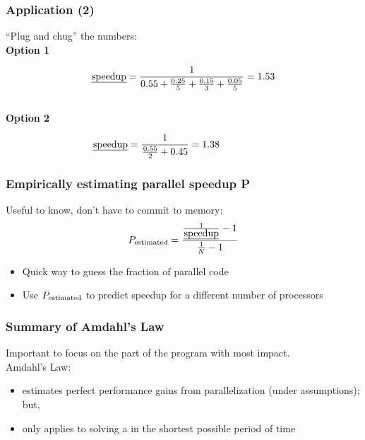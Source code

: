 \begin{frame}
  \frametitle{Application (2)}


  \hspace*{2em} ``Plug and chug'' the numbers:\\[1em]

  {\bf Option 1} \vspace*{-2em}

  \[ \mbox{\em speedup} = \frac{1}{0.55 + \frac{0.25}{5} + \frac{0.15}{3} + \frac{0.05}{5}}
    = 1.53 \]
~\\[1em]
  {\bf Option 2} \vspace*{-2em}

   \[\mbox{\em speedup} = \frac{1}{\frac{0.55}{2} + 0.45} = 1.38 \hspace*{5.5em}\]


\end{frame}

\begin{frame}
  \frametitle{Empirically estimating parallel speedup P}

  \hspace*{2em} Useful to know, don't have to commit to memory:
  \vfill
  \[P_{\mbox{\scriptsize estimated}} = \frac{\frac{1}{\mbox{\em speedup}}-1}{\frac{1}{N}-1}\]
  \vfill
  \hspace*{2em} \begin{minipage}{.8\textwidth} \begin{itemize}
    \item Quick way to guess the fraction of parallel code
    \item Use $P_{\mbox{\scriptsize estimated}}$ to predict speedup for a different number of processors
  \end{itemize} \end{minipage}
\end{frame}

\begin{frame}
  \frametitle{Summary of Amdahl's Law}

\hspace*{2em} Important to focus on the part of the program with most impact.\\[1em]

\hspace*{2em} Amdahl's Law:\\[1em]
\hspace*{2em}
  \begin{itemize}
    \item estimates perfect performance gains from
          parallelization (under assumptions); but,
    \vfill
    \item only applies to solving a  in the
          shortest possible period of time
  \end{itemize}
\end{frame}

